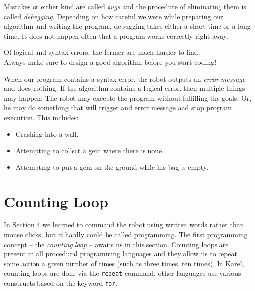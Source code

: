 \noindent
Mistakes or either kind are called {\em bugs} and the procedure of 
eliminating them is called {\em debugging}. Depending on how careful we 
were while preparing our algorithm and writing the program, debugging takes either 
a short time or a long time. It does not happen often that a program works correctly
right away. \\

\begin{gbox}
\begin{center}
Of logical and syntax errors, the former are much harder to find.\\
Always make sure to design a good algorithm before you start coding!
\end{center}
\end{gbox}
\vspace{4mm}

\noindent
When our program contains a syntax error,
the robot outputs an {\em error message} and does nothing.
If the algorithm contains a logical error, then multiple 
things may happen: The robot may execute the program 
without fulfilling the goals. Or, he may do something 
that will trigger and error message and stop program 
execution. This includes:

\begin{itemize}
\item Crashing into a wall.
\item Attempting to collect a gem where there is none.
\item Attempting to put a gem on the ground while his bag is empty.
\end{itemize}


\section{Counting Loop} \label{sec:repeat}

In Section 4 we learned to command the robot using written words rather than mouse 
clicks, but it hardly could be called programming. The first programming concept -- 
the {\em counting loop} -- awaits us in this section. Counting loops 
are present in all procedural programming languages and they
allow us to repeat some action a given number of times (such 
as three times, ten times). In Karel, counting 
loops are done via the {\tt repeat} command, other languages
use various constructs based on the keyword {\tt for}.  

